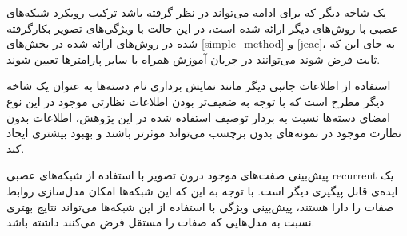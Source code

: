 یک شاخه دیگر که برای ادامه می‌تواند در نظر گرفته باشد ترکیب رویکرد شبکه‌های عصبی با روش‌های دیگر ارائه شده است، در این حالت با ویژگی‌های تصویر بکارگرفته شده در روش‌های ارائه شده در بخش‌های
\ref{simple_method}
و \ref{jeac}، به جای این که ثابت فرض شوند می‌توانند در جریان آموزش همراه با سایر پارامترها تعیین شوند.

استفاده از اطلاعات جانبی دیگر مانند نمایش برداری نام دسته‌ها به عنوان یک شاخه دیگر مطرح است که با توجه به ضعیف‌تر بودن اطلاعات نظارتی موجود در این نوع امضای  دسته‌ها نسبت به بردار توصیف استفاده شده در این پژوهش، اطلاعات بدون نظارت موجود در نمونه‌های بدون برچسب  می‌تواند موثرتر باشند و بهبود بیشتری ایجاد کند.

پیش‌بینی صفت‌های موجود درون تصویر با استفاده از شبکه‌های عصبی \gls{recurrent} یک ایده‌ی قابل پیگیری دیگر است. با توجه به این که این شبکه‌ها امکان مدل‌سازی روابط صفات را دارا هستند، پیش‌بینی ویژگی با استفاده از این شبکه‌ها می‌تواند نتایج بهتری نسبت به مدل‌هایی که صفات را مستقل فرض می‌کنند داشته باشد. 
